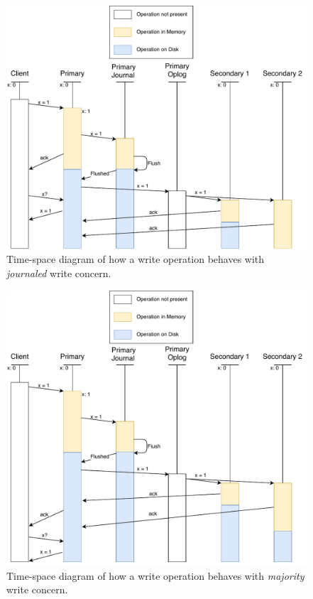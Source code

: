 \begin{figure}
    \centering        
    \includegraphics{images/JournaledWriteConcern.pdf}
    \caption{Time-space diagram of how a write operation behaves with \textit{journaled} write concern.}
    \label{fig:writecon-journaled}
\end{figure}

\begin{figure}
    \centering        
    \includegraphics{images/MajorityWriteConcern.pdf}
    \caption{Time-space diagram of how a write operation behaves with \textit{majority} write concern.}
    \label{fig:writecon-majority}
\end{figure}

